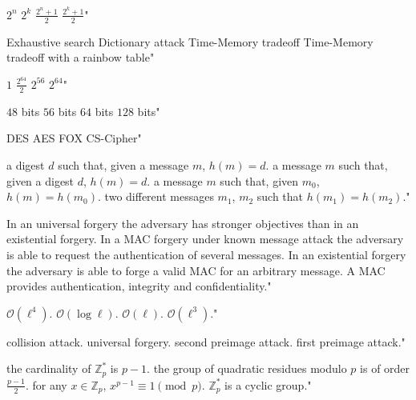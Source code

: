 {$2^n$}
{$2^k$}
{$\frac{2^n+1}{2}$}
{$\frac{2^k+1}{2}$"}

{Exhaustive search}
{Dictionary attack}
{Time-Memory tradeoff}
{Time-Memory tradeoff with a rainbow table"}

{$1$}
{$\frac{2^{64}}{2}$}
{$2^{56}$}
{$2^{64}$"}

{$48$ bits}
{$56$ bits}
{$64$ bits}
{$128$ bits"}

{DES}
{AES}
{FOX}
{CS-Cipher"}

{a digest $d$ such that, given a message $m$, $h(m)=d$.}
{a message $m$ such that, given a digest $d$, $h(m)=d$.}
{a message $m$ such that, given $m_0$, $h(m)=h(m_0)$.}
{two different messages $m_1$, $m_2$ such that $h(m_1)=h(m_2)$."}

{In an universal forgery the adversary has stronger objectives than in an existential forgery.}
{In a MAC forgery under known message attack the adversary is able to request the authentication of several messages.}
{In an existential forgery the adversary is able to forge a valid MAC for an arbitrary message.}
{A MAC provides authentication, integrity and confidentiality."}

{$\mathcal{O}(\ell^4)$.}
{$\mathcal{O}(\log \ell)$.}
{$\mathcal{O}(\ell)$.}
{$\mathcal{O}(\ell^3)$."}

{collision attack.}
{universal forgery.}
{second preimage attack.}
{first preimage attack."}

{the cardinality of $\mathbb{Z}_p^*$ is $p-1$.}
{the group of quadratic residues modulo $p$ is of order $\frac{p-1}{2}$.}
{for any $x \in \mathbb{Z}_p$, $x^{p-1} \equiv 1 \pmod{p}$.}
{$\mathbb{Z}_p^*$ is a cyclic group."}

